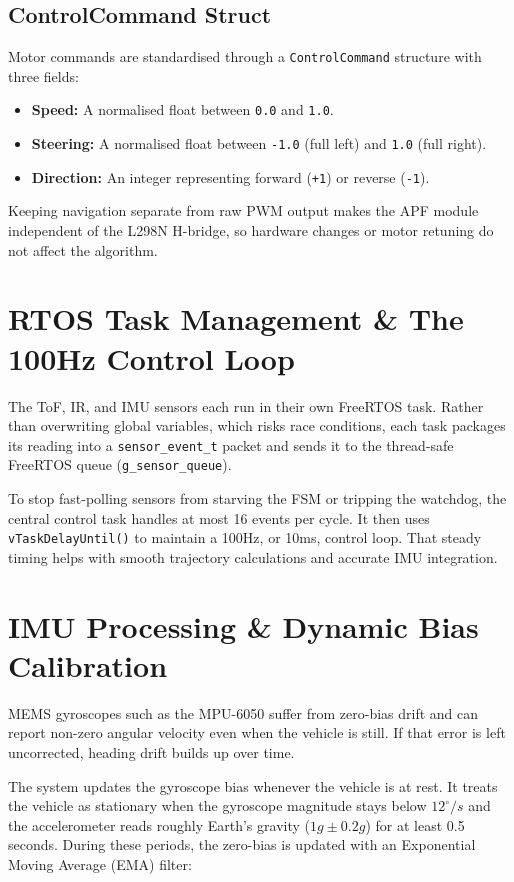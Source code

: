 \subsection{ControlCommand Struct}
Motor commands are standardised through a \texttt{ControlCommand} structure with three fields:
\begin{itemize}
    \item \textbf{Speed:} A normalised float between \texttt{0.0} and \texttt{1.0}.
    \item \textbf{Steering:} A normalised float between \texttt{-1.0} (full left) and \texttt{1.0} (full right).
    \item \textbf{Direction:} An integer representing forward (\texttt{+1}) or reverse (\texttt{-1}).
\end{itemize}
Keeping navigation separate from raw PWM output makes the APF module independent of the L298N H-bridge, so hardware changes or motor retuning do not affect the algorithm.
\section{RTOS Task Management \& The 100Hz Control Loop}
\label{sec:rtos_tasks}
The ToF, IR, and IMU sensors each run in their own FreeRTOS task. Rather than overwriting global variables, which risks race conditions, each task packages its reading into a \texttt{sensor\_event\_t} packet and sends it to the thread-safe FreeRTOS queue (\texttt{g\_sensor\_queue}).

To stop fast-polling sensors from starving the FSM or tripping the watchdog, the central control task handles at most 16 events per cycle. It then uses \texttt{vTaskDelayUntil()} to maintain a 100Hz, or 10ms, control loop. That steady timing helps with smooth trajectory calculations and accurate IMU integration.

\section{IMU Processing \& Dynamic Bias Calibration}
\label{sec:imu_bias}
MEMS gyroscopes such as the MPU-6050 suffer from zero-bias drift and can report non-zero angular velocity even when the vehicle is still. If that error is left uncorrected, heading drift builds up over time.

The system updates the gyroscope bias whenever the vehicle is at rest. It treats the vehicle as stationary when the gyroscope magnitude stays below $12^{\circ}/s$ and the accelerometer reads roughly Earth's gravity ($1g \pm 0.2g$) for at least 0.5 seconds. During these periods, the zero-bias is updated with an Exponential Moving Average (EMA) filter:

